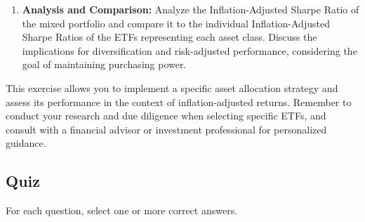 \documentclass{article}
\begin{document}
\begin{enumerate}
    \item \textbf{Analysis and Comparison:} Analyze the Inflation-Adjusted Sharpe Ratio of the mixed portfolio and compare it to the individual Inflation-Adjusted Sharpe Ratios of the ETFs representing each asset class. Discuss the implications for diversification and risk-adjusted performance, considering the goal of maintaining purchasing power.
\end{enumerate}

This exercise allows you to implement a specific asset allocation strategy and assess its performance in the context of inflation-adjusted returns. Remember to conduct your research and due diligence when selecting specific ETFs, and consult with a financial advisor or investment professional for personalized guidance.

\subsection{Quiz}
For each question, select one or more correct answers.
\end{document}

